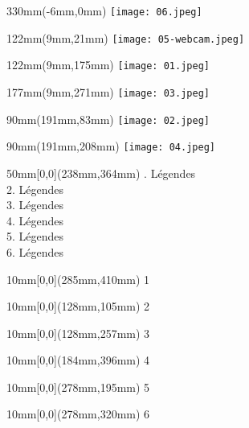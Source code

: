 \documentclass[12pt]{article}
\begin{document}
\begin{textblock*}{330mm}(-6mm,0mm)%
	\texttt{[image: 06.jpeg]}
\end{textblock*}

\begin{textblock*}{122mm}(9mm,21mm)%
	\texttt{[image: 05-webcam.jpeg]}
\end{textblock*}

\begin{textblock*}{122mm}(9mm,175mm)%
	\texttt{[image: 01.jpeg]}
\end{textblock*}

\begin{textblock*}{177mm}(9mm,271mm)%
	\texttt{[image: 03.jpeg]}
\end{textblock*}

\begin{textblock*}{90mm}(191mm,83mm)%
	\texttt{[image: 02.jpeg]}
\end{textblock*}

\begin{textblock*}{90mm}(191mm,208mm)%
	\texttt{[image: 04.jpeg]}
\end{textblock*}

\TPMargin{5mm}
\begin{textblock*}{50mm}[0,0](238mm,364mm)
. Légendes \\
2. Légendes \\
3. Légendes \\
4. Légendes \\
5. Légendes \\
6. Légendes 
\end{textblock*}

\TPMargin{3mm}
\begin{textblock*}{10mm}[0,0](285mm,410mm)
\noindent
\color{white}
1
\end{textblock*}

\begin{textblock*}{10mm}[0,0](128mm,105mm)
\noindent
\color{white}
2
\end{textblock*}

\begin{textblock*}{10mm}[0,0](128mm,257mm)
\noindent
\color{white}
3
\end{textblock*}

\begin{textblock*}{10mm}[0,0](184mm,396mm)
\noindent
\color{white}
4
\end{textblock*}

\begin{textblock*}{10mm}[0,0](278mm,195mm)
\noindent
\color{white}
5
\end{textblock*}

\begin{textblock*}{10mm}[0,0](278mm,320mm)
\noindent
\color{white}
6
\end{textblock*}
\end{document}
